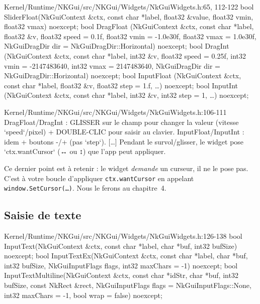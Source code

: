 \begin{nkcode}{Kernel/Runtime/NKGui/src/NKGui/Widgets/NkGuiWidgets.h:65, 112-122}
bool SliderFloat(NkGuiContext &ctx, const char *label, float32 &value, float32 vmin, float32 vmax) noexcept;
bool DragFloat  (NkGuiContext &ctx, const char *label, float32 &v, float32 speed = 0.1f,
                 float32 vmin = -1.0e30f, float32 vmax = 1.0e30f,
                 NkGuiDragDir dir = NkGuiDragDir::Horizontal) noexcept;
bool DragInt    (NkGuiContext &ctx, const char *label, int32 &v, float32 speed = 0.25f,
                 int32 vmin = -2147483640, int32 vmax = 2147483640,
                 NkGuiDragDir dir = NkGuiDragDir::Horizontal) noexcept;
bool InputFloat (NkGuiContext &ctx, const char *label, float32 &v, float32 step = 1.f, …) noexcept;
bool InputInt   (NkGuiContext &ctx, const char *label, int32 &v, int32 step = 1, …) noexcept;
\end{nkcode}

\begin{nkcode}{Kernel/Runtime/NKGui/src/NKGui/Widgets/NkGuiWidgets.h:106-111}
DragFloat/DragInt : GLISSER sur le champ pour changer la valeur (vitesse
`speed`/pixel) + DOUBLE-CLIC pour saisir au clavier. InputFloat/InputInt : idem
+ boutons -/+ (pas `step`). […] Pendant le survol/glisser, le widget pose
`ctx.wantCursor` (↔ ou ↕) que l'app peut appliquer.
\end{nkcode}

Ce dernier point est à retenir : le widget \emph{demande} un curseur, il ne le
pose pas. C'est à votre boucle d'appliquer \texttt{ctx.wantCursor} en appelant
\texttt{window.SetCursor(\dots)}. Nous le ferons au chapitre~4.

\subsection{Saisie de texte}

\begin{nkcode}{Kernel/Runtime/NKGui/src/NKGui/Widgets/NkGuiWidgets.h:126-138}
bool InputText(NkGuiContext &ctx, const char *label, char *buf, int32 bufSize) noexcept;
bool InputTextEx(NkGuiContext &ctx, const char *label, char *buf, int32 bufSize,
                 NkGuiInputFlags flags, int32 maxChars = -1) noexcept;
bool InputTextMultiline(NkGuiContext &ctx, const char *idStr, char *buf, int32 bufSize,
                        const NkRect &rect, NkGuiInputFlags flags = NkGuiInputFlags::None,
                        int32 maxChars = -1, bool wrap = false) noexcept;
\end{nkcode}


